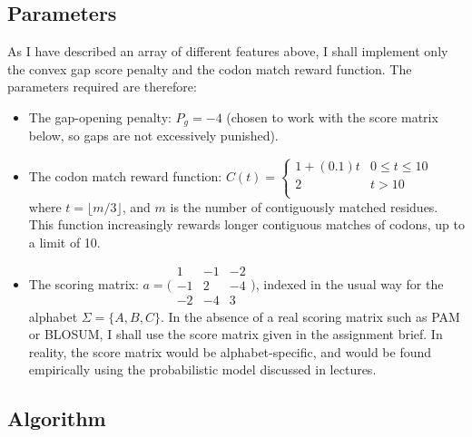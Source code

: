 \documentclass[a4paper]{article}
\begin{document}
\subsection{Parameters}
As I have described an array of different features above, I shall implement only the convex gap score penalty and the codon match reward function. The parameters required are therefore:
\begin{itemize}
\item The gap-opening penalty: $P_g = -4$ (chosen to work with the score matrix below, so gaps are not excessively punished).
\item The codon match reward function: $ C(t) = \begin{cases} 
      1 + (0.1)t & 0 \leq t \leq 10 \\
      2 & t > 10 \\
      \end{cases} $ where $t = \lfloor{m/3}\rfloor$, and $m$ is the number of contiguously matched residues. This function increasingly rewards longer contiguous matches of codons, up to a limit of 10. 
\item The scoring matrix: $a =  \bigl( \begin{smallmatrix}1 & -1 & -2\\ -1 & 2 & -4\\ -2 & -4 & 3\end{smallmatrix}\bigr)$, indexed in the usual way for the alphabet $\Sigma = \{A, B, C\}$. In the absence of a real scoring matrix such as PAM or BLOSUM, I shall use the score matrix given in the assignment brief. In reality, the score matrix would be alphabet-specific, and would be found empirically using the probabilistic model discussed in lectures. 

\end{itemize}
\subsection{Algorithm}
\end{document}
